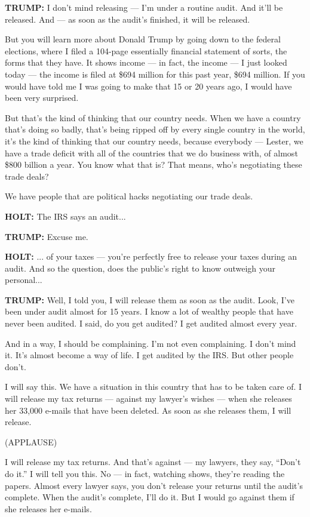 \textbf{TRUMP:} I don't mind releasing --- I'm under a routine audit.
And it'll be released. And --- as soon as the audit's finished, it will
be released.

But you will learn more about Donald Trump by going down to the federal
elections, where I filed a 104-page essentially financial statement of
sorts, the forms that they have. It shows income --- in fact, the income
--- I just looked today --- the income is filed at \$694 million for
this past year, \$694 million. If you would have told me I was going to
make that 15 or 20 years ago, I would have been very surprised.

But that's the kind of thinking that our country needs. When we have a
country that's doing so badly, that's being ripped off by every single
country in the world, it's the kind of thinking that our country needs,
because everybody --- Lester, we have a trade deficit with all of the
countries that we do business with, of almost \$800 billion a year. You
know what that is? That means, who's negotiating these trade deals?

We have people that are political hacks negotiating our trade deals.

\textbf{HOLT:} The IRS says an audit...

\textbf{TRUMP:} Excuse me.

\textbf{HOLT:} ... of your taxes --- you're perfectly free to release
your taxes during an audit. And so the question, does the public's right
to know outweigh your personal...

\textbf{TRUMP:} Well, I told you, I will release them as soon as the
audit. Look, I've been under audit almost for 15 years. I know a lot of
wealthy people that have never been audited. I said, do you get audited?
I get audited almost every year.

And in a way, I should be complaining. I'm not even complaining. I don't
mind it. It's almost become a way of life. I get audited by the IRS. But
other people don't.

I will say this. We have a situation in this country that has to be
taken care of. I will release my tax returns --- against my lawyer's
wishes --- when she releases her 33,000 e-mails that have been deleted.
As soon as she releases them, I will release.

(APPLAUSE)

I will release my tax returns. And that's against --- my lawyers, they
say, ``Don't do it.'' I will tell you this. No --- in fact, watching
shows, they're reading the papers. Almost every lawyer says, you don't
release your returns until the audit's complete. When the audit's
complete, I'll do it. But I would go against them if she releases her
e-mails.

